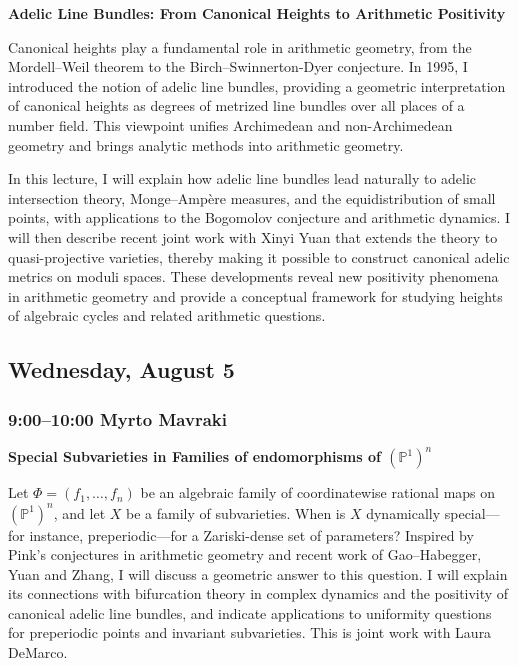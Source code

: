 \documentclass[11pt]{amsart}
\numberwithin{equation}{section}
\begin{document}
\textbf{Adelic Line Bundles: From Canonical Heights to Arithmetic Positivity}

Canonical heights play a fundamental role in arithmetic geometry, from the Mordell--Weil theorem to the Birch--Swinnerton-Dyer conjecture. In 1995, I introduced the notion of adelic line bundles, providing a geometric interpretation of canonical heights as degrees of metrized line bundles over all places of a number field. This viewpoint unifies Archimedean and non-Archimedean geometry and brings analytic methods into arithmetic geometry.

In this lecture, I will explain how adelic line bundles lead naturally to adelic intersection theory, Monge--Amp\`ere measures, and the equidistribution of small points, with applications to the Bogomolov conjecture and arithmetic dynamics. I will then describe recent joint work with Xinyi Yuan that extends the theory to quasi-projective varieties, thereby making it possible to construct canonical adelic metrics on moduli spaces. These developments reveal new positivity phenomena in arithmetic geometry and provide a conceptual framework for studying heights of algebraic cycles and related arithmetic questions.

\newpage

\subsection*{Wednesday, August 5}

\subsubsection*{9:00--10:00 \quad Myrto Mavraki}

\textbf{Special Subvarieties in Families of endomorphisms of $(\mathbb{P}^1)^n$}

Let $\Phi=(f_1,\ldots,f_n)$ be an algebraic family of coordinatewise rational maps on $(\mathbb P^1)^n$, and let $X$ be a family of subvarieties. When is $X$ dynamically special---for instance, preperiodic---for a Zariski-dense set of parameters? Inspired by Pink's conjectures in arithmetic geometry and recent work of Gao--Habegger, Yuan and Zhang, I will discuss a geometric answer to this question. I will explain its connections with bifurcation theory in complex dynamics and the positivity of canonical adelic line bundles, and indicate applications to uniformity questions for preperiodic points and invariant subvarieties. This is joint work with Laura DeMarco.
\end{document}
